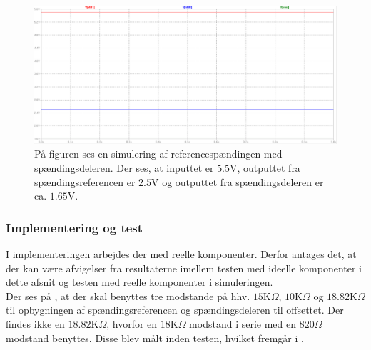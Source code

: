 \begin{figure}[H]
	\centering
	\includegraphics[scale=.3]{figures/cProblemloesning/Reference_sim_off.PNG}
	\caption{På figuren ses en simulering af referencespændingen med spændingsdeleren. Der ses, at inputtet er $5.5$V, outputtet fra spændingsreferencen er $2.5$V og outputtet fra spændingsdeleren er ca. $1.65$V.}
	\label{fig:Spaendingsreference_offset_sim}
\end{figure}

\subsubsection{Implementering og test}\label{spaendingsref_resultat}
I implementeringen arbejdes der med reelle komponenter. Derfor antages det, at der kan være afvigelser fra resultaterne imellem testen med ideelle komponenter i dette afsnit og testen med reelle komponenter i simuleringen. \\
Der ses på , at der skal benyttes tre modstande på hhv. $15$K$\Omega$, $10$K$\Omega$ og $18.82$K$\Omega$ til opbygningen af spændingsreferencen og spændingsdeleren til offsettet. Der findes ikke en $18.82$K$\Omega$, hvorfor en $18$K$\Omega$ modstand i serie med en $820\Omega$ modstand benyttes. Disse blev målt inden testen, hvilket fremgår i .

